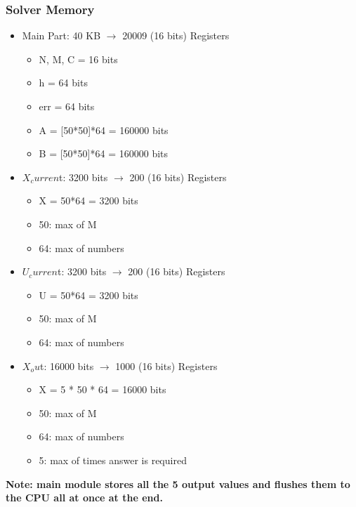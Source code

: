 \documentclass[12pt]{report}
\begin{document}
\subsubsection{Solver Memory}
\begin{itemize}
    \item Main Part: 40 KB $\rightarrow$ 20009 (16 bits) Registers
    \begin{itemize}
        \item N, M, C = 16 bits
        \item h = 64 bits
        \item err = 64 bits
        \item A = [50*50]*64 = 160000 bits
        \item B = [50*50]*64 = 160000 bits
    \end{itemize}
    \item $X_curren$t: 3200 bits $\rightarrow$ 200 (16 bits) Registers
    \begin{itemize}
        \item X = 50*64 = 3200 bits
        \item 50: max of M
        \item 64: max of numbers
    \end{itemize}
    \item $U_curren$t: 3200 bits $\rightarrow$ 200 (16 bits) Registers
    \begin{itemize}
        \item U = 50*64 = 3200 bits
        \item 50: max of M
        \item 64: max of numbers
    \end{itemize}
    \item $X_ou$t: 16000 bits $\rightarrow$ 1000 (16 bits) Registers
    \begin{itemize}
        \item X = 5 * 50 * 64 = 16000 bits
        \item 50: max of M
        \item 64: max of numbers
        \item 5: max of times answer is required
    \end{itemize}
\end{itemize}

\textbf{Note: main module stores all the 5 output values and flushes them to the CPU all at once at the end.}
\end{document}
